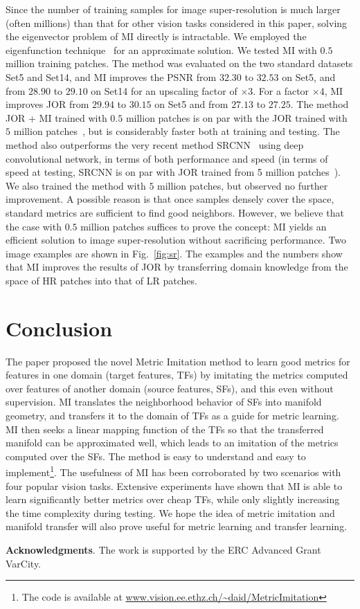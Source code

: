 \documentclass[10pt,twocolumn,letterpaper]{article}
\begin{document}
Since the number of training samples for image super-resolution is
much larger (often millions) than that for other vision tasks considered 
in this paper, solving the eigenvector problem of MI directly is 
intractable. We employed the eigenfunction technique~\cite{Fergus09} 
for an approximate solution.  We
tested MI with $0.5$ million training patches.  The method was
evaluated on the two standard datasets Set5 and Set14, and MI improves
the PSNR from $32.30$ to $32.53$ on Set5, and from $28.90$ to $29.10$
on Set14 for an upscaling factor of $\times 3$. For a factor $\times 4$,
MI improves JOR from $29.94$ to $30.15$ on Set5 and from $27.13$ to
$27.25$. The method JOR + MI trained with $0.5$ million patches is on
par with the JOR trained with $5$ million patches~\cite{JOR:EG15}, but
is considerably faster both at training and testing.  The method also
outperforms the very recent method SRCNN~\cite{Dong-ECCV-2014} using
deep convolutional network, in terms of both performance and speed (in
terms of speed at testing, SRCNN is on par with JOR trained from 5
million patches~\cite{JOR:EG15}). We also trained the
method with $5$ million patches, but observed no further improvement. 
A possible reason is that once samples densely cover
the space, standard metrics are sufficient to find good
neighbors. However, we believe that the case with $0.5$ million
patches suffices to prove the concept: MI yields an
efficient solution to image super-resolution without sacrificing 
performance.
Two image examples are shown in Fig.~\ref{fig:sr}. The examples and
the numbers show that MI improves the results of JOR by
transferring domain knowledge from the space of HR patches into that
of LR patches. 


\section{Conclusion}
\label{sec:con}
The paper proposed the novel Metric Imitation method to
learn good metrics for features in one domain (target
features, TFs) by imitating the metrics computed over features of
another domain (source features, SFs), and this even without supervision. 
MI translates the neighborhood
behavior of SFs into manifold geometry, and transfers it to the domain
of TFs as a guide for metric learning. MI then seeks a linear mapping
function of the TFs so that the transferred manifold can be
approximated well, which leads to an imitation of the metrics computed
over the SFs. The method is easy to understand and easy to
implement\footnote{The code is available at
  \url{www.vision.ee.ethz.ch/~daid/MetricImitation}}.  The usefulness
of MI has been corroborated by two scenarios with four popular vision
tasks. Extensive experiments have shown that MI is able to learn 
significantly better metrics over cheap TFs, while only slightly
increasing the time complexity during testing. We hope the idea of metric
imitation and manifold transfer will also prove useful for metric
learning and transfer learning.

\noindent
\textbf{Acknowledgments}. The work is supported by the ERC Advanced
Grant VarCity. 

  {\footnotesize 
   }
\end{document}

